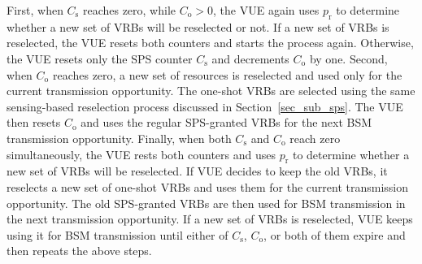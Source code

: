 \documentclass[conference]{IEEEtran}
\begin{document}
First, when $C_{\mathrm{s}}$ reaches zero, while $C_{\mathrm{o}}>0$, the VUE again uses $p_{\mathrm{r}}$ to determine whether a new set of VRBs will be reselected or not. If a new set of VRBs is reselected, the VUE resets both counters and starts the process again. Otherwise, the VUE resets only the SPS counter $C_{\mathrm{s}}$ and decrements $C_{\mathrm{o}}$ by one. Second, when $C_{\mathrm{o}}$ reaches zero, a new set of resources is reselected and used only for the current transmission opportunity. The one-shot VRBs are selected using the same sensing-based reselection process discussed in Section~\ref{sec_sub_sps}. The VUE then resets $C_{\mathrm{o}}$ and uses the regular SPS-granted VRBs for the next BSM transmission opportunity. Finally, when both $C_{\mathrm{s}}$ and $C_{\mathrm{o}}$ reach zero simultaneously, the VUE rests both counters and uses $p_{\mathrm{r}}$ to determine whether a new set of VRBs will be reselected. If VUE decides to keep the old VRBs, it reselects a new set of one-shot VRBs and uses them for the current transmission opportunity. The old SPS-granted VRBs are then used for BSM transmission in the next transmission opportunity. If a new set of VRBs is reselected, VUE keeps using it for BSM transmission until either of $C_{\mathrm{s}}$, $C_{\mathrm{o}}$, or both of them expire and then repeats the above steps. 
\end{document}

